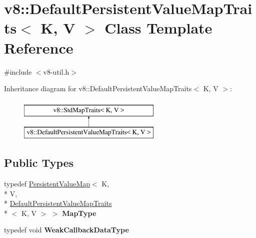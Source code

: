 \hypertarget{classv8_1_1DefaultPersistentValueMapTraits}{\section{v8\-:\-:Default\-Persistent\-Value\-Map\-Traits$<$ K, V $>$ Class Template Reference}
\label{classv8_1_1DefaultPersistentValueMapTraits}
}


{\ttfamily \#include $<$v8-\/util.\-h$>$}

Inheritance diagram for v8\-:\-:Default\-Persistent\-Value\-Map\-Traits$<$ K, V $>$\-:\begin{figure}[H]
\begin{center}
\leavevmode
\includegraphics[height=2.000000cm]{classv8_1_1DefaultPersistentValueMapTraits}
\end{center}
\end{figure}
\subsection*{Public Types}
\begin{DoxyCompactItemize}
\item 
\hypertarget{classv8_1_1DefaultPersistentValueMapTraits_a05cbd536d6bb9ba4949198351e074854}{typedef \hyperlink{classv8_1_1PersistentValueMap}{Persistent\-Value\-Map}$<$ K, \\*
V, \\*
\hyperlink{classv8_1_1DefaultPersistentValueMapTraits}{Default\-Persistent\-Value\-Map\-Traits}\\*
$<$ K, V $>$ $>$ {\bfseries Map\-Type}}\label{classv8_1_1DefaultPersistentValueMapTraits_a05cbd536d6bb9ba4949198351e074854}

\item 
\hypertarget{classv8_1_1DefaultPersistentValueMapTraits_a379f8c42e727a9576fb0954bb0245d8f}{typedef void {\bfseries Weak\-Callback\-Data\-Type}}\label{classv8_1_1DefaultPersistentValueMapTraits_a379f8c42e727a9576fb0954bb0245d8f}

\end{DoxyCompactItemize}
